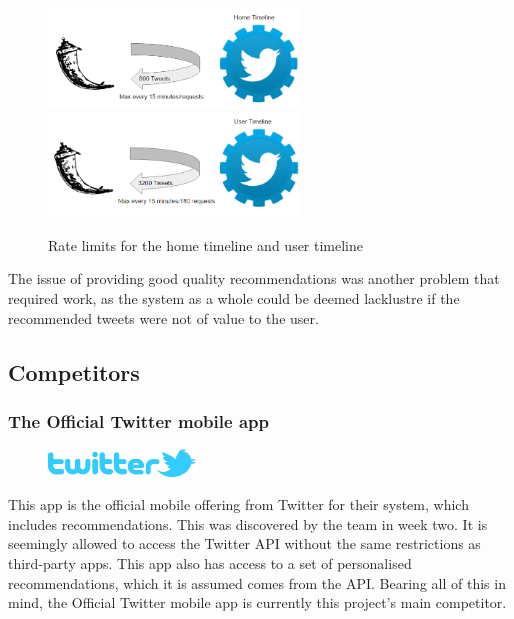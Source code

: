 \documentclass{article}
\begin{document}
\begin{figure}[H]
    \centering
    \includegraphics[width=0.6\textwidth]{rate_limit_1}
    \includegraphics[width=0.6\textwidth]{rate_limit_2}
    \caption{Rate limits for the home timeline and user timeline}
    \label{fig:my_label}
\end{figure}


The issue of providing good quality recommendations was another problem that required work, as the system as a whole could be deemed lacklustre if the recommended tweets were not of value to the user. 



\subsection{Competitors} 


\subsubsection*{The Official Twitter mobile app}

\begin{figure}[H]
    \includegraphics[width=0.35\textwidth, center]{twitter_logo}
\end{figure}
This app is the official mobile offering from Twitter for their system, which includes recommendations. This was discovered by the team in week two. It is seemingly allowed to access the Twitter API without the same restrictions as third-party apps. This app also has access to a set of personalised recommendations, which it is assumed comes from the API. Bearing all of this in mind, the Official Twitter mobile app is currently this project's main competitor. 
\end{document}
